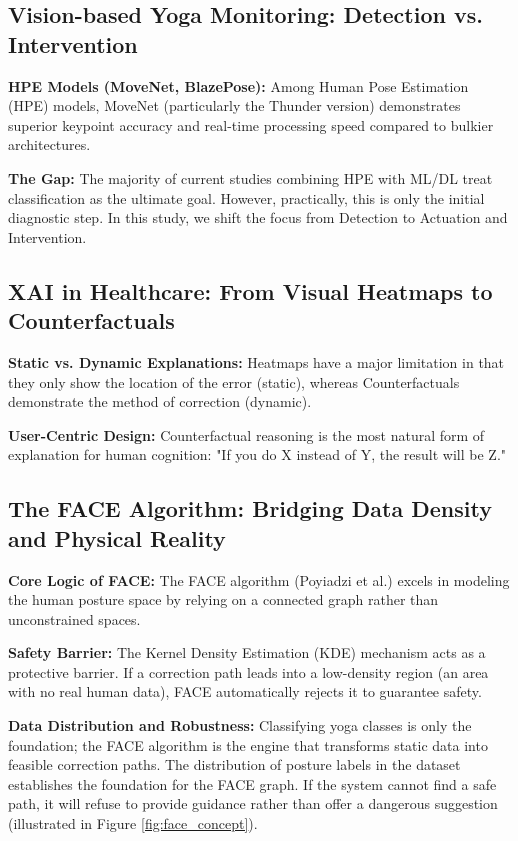 \documentclass[pdflatex,sn-mathphys-num]{sn-jnl}%
\theoremstyle{thmstyleone}%
\theoremstyle{thmstyletwo}%
\theoremstyle{thmstylethree}%
\begin{document}
\subsection{Vision-based Yoga Monitoring: Detection vs. Intervention}
\textbf{HPE Models (MoveNet, BlazePose):} Among Human Pose Estimation (HPE) models, MoveNet (particularly the Thunder version) demonstrates superior keypoint accuracy and real-time processing speed compared to bulkier architectures. 

\textbf{The Gap:} The majority of current studies combining HPE with ML/DL treat classification as the ultimate goal. However, practically, this is only the initial diagnostic step. In this study, we shift the focus from Detection to Actuation and Intervention.

\subsection{XAI in Healthcare: From Visual Heatmaps to Counterfactuals}
\textbf{Static vs. Dynamic Explanations:} Heatmaps have a major limitation in that they only show the location of the error (static), whereas Counterfactuals demonstrate the method of correction (dynamic). 

\textbf{User-Centric Design:} Counterfactual reasoning is the most natural form of explanation for human cognition: "If you do X instead of Y, the result will be Z."

\subsection{The FACE Algorithm: Bridging Data Density and Physical Reality}
\textbf{Core Logic of FACE:} The FACE algorithm (Poyiadzi et al.) excels in modeling the human posture space by relying on a connected graph rather than unconstrained spaces. 

\textbf{Safety Barrier:} The Kernel Density Estimation (KDE) mechanism acts as a protective barrier. If a correction path leads into a low-density region (an area with no real human data), FACE automatically rejects it to guarantee safety. 

\textbf{Data Distribution and Robustness:} Classifying yoga classes is only the foundation; the FACE algorithm is the engine that transforms static data into feasible correction paths. The distribution of posture labels in the dataset establishes the foundation for the FACE graph. If the system cannot find a safe path, it will refuse to provide guidance rather than offer a dangerous suggestion (illustrated in Figure \ref{fig:face_concept}).
\end{document}
